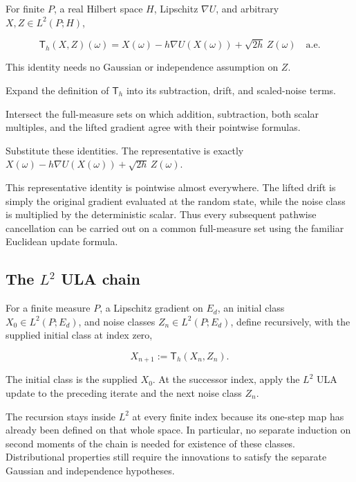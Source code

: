 \documentclass[11pt,a4paper]{article}
\begin{document}
For finite \(P\), a real Hilbert space \(H\), Lipschitz \(\nabla U\), and arbitrary \(X,Z\in L^2(P;H)\),

\[\mathsf T_h(X,Z)(\omega)=X(\omega)-h\nabla U(X(\omega))+\sqrt{2h}\,Z(\omega)\quad\text{a.e.}\]

This identity needs no Gaussian or independence assumption on \(Z\).



Expand the definition of \(\mathsf T_h\) into its subtraction, drift, and scaled-noise terms.



Intersect the full-measure sets on which addition, subtraction, both scalar multiples, and the lifted gradient agree with their pointwise formulas.



Substitute these identities. The representative is exactly \(X(\omega)-h\nabla U(X(\omega))+\sqrt{2h}\,Z(\omega)\).



This representative identity is pointwise almost everywhere. The lifted drift is simply the original gradient evaluated at the random state, while the noise class is multiplied by the deterministic scalar. Thus every subsequent pathwise cancellation can be carried out on a common full-measure set using the familiar Euclidean update formula.


\subsection{\texorpdfstring{The \(L^2\) ULA chain}{The L² ULA chain}}


For a finite measure \(P\), a Lipschitz gradient on \(E_d\), an initial class \(X_0\in L^2(P;E_d)\), and noise classes \(Z_n\in L^2(P;E_d)\), define recursively, with the supplied initial class at index zero,

\[X_{n+1}:=\mathsf T_h(X_n,Z_n).\]

The initial class is the supplied \(X_0\). At the successor index, apply the \(L^2\) ULA update to the preceding iterate and the next noise class \(Z_n\).



The recursion stays inside \(L^2\) at every finite index because its one-step map has already been defined on that whole space. In particular, no separate induction on second moments of the chain is needed for existence of these classes. Distributional properties still require the innovations to satisfy the separate Gaussian and independence hypotheses.
\end{document}
